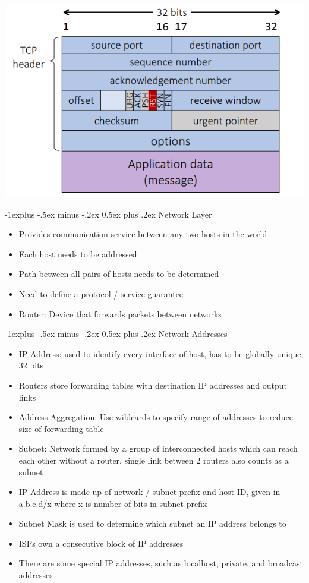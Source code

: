 \documentclass[10pt, landscape]{article}
\makeatletter
\renewcommand{\section}{\@startsection{section}{1}{0mm}%
                                {-1ex plus -.5ex minus -.2ex}%
                                {0.5ex plus .2ex}%
                                {\normalfont\large\bfseries}}
\renewcommand{\section}{\@startsection{section}{2}{0mm}%
                                {-1explus -.5ex minus -.2ex}%
                                {0.5ex plus .2ex}%
                                {\normalfont\normalsize\bfseries}}
\makeatother
\begin{document}
\begin{multicols*}{3}
\begin{itemize}
\end{itemize}
\begin{center}
    \includegraphics[width=0.9\linewidth]{TCP.png}
\end{center}

\section{Network Layer}
\begin{itemize}
    \item Provides communication service between any two hosts in the world
    \item Each host needs to be addressed
    \item Path between all pairs of hosts needs to be determined
    \item Need to define a protocol / service guarantee
    \item Router: Device that forwards packets between networks
\end{itemize}

\section{Network Addresses}
\begin{itemize}
    \item IP Address: used to identify every interface of host, has to be globally unique, 32 bits
    \item Routers store forwarding tables with destination IP addresses and output links
    \item Address Aggregation: Use wildcards to specify range of addresses to reduce size of forwarding table
    \item Subnet: Network formed by a group of interconnected hosts which can reach each other without a router, single link between 2 routers also counts as a subnet
    \item IP Address is made up of network / subnet prefix and host ID, given in a.b.c.d/x where x is number of bits in subnet prefix
    \item Subnet Mask is used to determine which subnet an IP address belongs to
    \item ISPs own a consecutive block of IP addresses
    \item There are some special IP addresses, such as localhost, private, and broadcast addresses
\end{itemize}


\end{multicols*}
\end{document}
